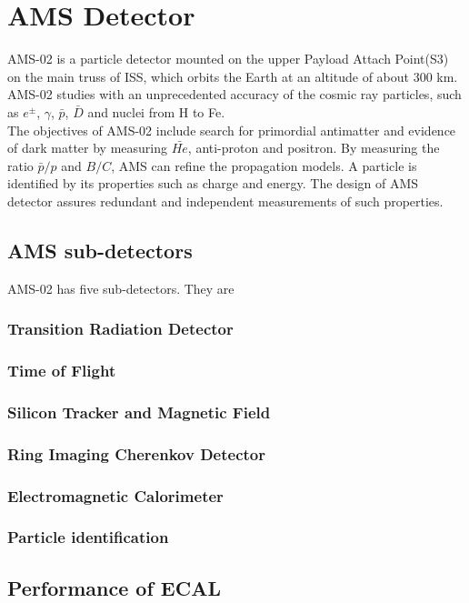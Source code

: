 \part{AMS Detector}
AMS-02 is a particle detector mounted on the upper Payload Attach Point(S3) on the main truss of ISS, which orbits the Earth at an altitude of about 300 km. AMS-02 studies with an unprecedented accuracy of the cosmic ray particles, such as $e^{\pm}$, $\gamma$, $\bar{p}$, $\bar{D}$ and nuclei from H to Fe.\\
The objectives of AMS-02 include search for primordial antimatter and evidence of dark matter by measuring $\bar{He}$, anti-proton and positron. By measuring the ratio $\bar{p}/p$ and $B/C$, AMS can refine the propagation models.
A particle is identified by its properties such as charge and energy. The design of AMS detector assures redundant and independent measurements of such properties.
\chapter{AMS sub-detectors}
AMS-02 has five sub-detectors. They are 
\section{Transition Radiation Detector}
\section{Time of Flight}
\section{Silicon Tracker and Magnetic Field}
\section{Ring Imaging Cherenkov Detector}
\section{Electromagnetic Calorimeter}
\section{Particle identification}

\chapter{Performance of ECAL}

